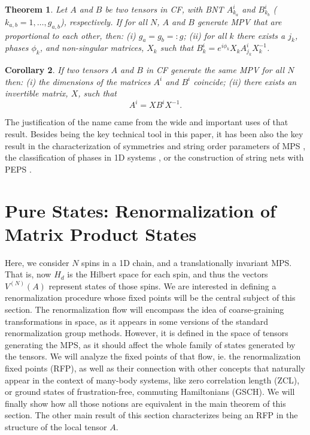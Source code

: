 \documentclass{elsarticle}
\newcommand{\be}{\begin{equation}}
\newcommand{\ee}{\end{equation}}
\newtheorem{thm}{Theorem}[section]
\newtheorem{cor}[thm]{Corollary}
\begin{document}
\begin{thm}
\label{thm1}
Let $A$ and $B$ be two tensors in CF, with BNT $A^i_{k_a}$ and $B^i_{k_b}$ ($k_{a,b}=1,\dots,g_{a,b}$), respectively. If for all $N$, $A$ and $B$ generate MPV that are proportional to each other, then: (i) $g_a=g_b=:g$; (ii) for all $k$ there exists a $j_k$, phases $\phi_{k}$, and non-singular matrices, $X_{k}$ such that $B^i_{k}=e^{i\phi_{k}}X_{k}A^i_{j_k}X_{k}^{-1}$.
\end{thm}

\begin{cor}
\label{II_cor2}
If two tensors $A$ and $B$ in CF generate the same MPV for all $N$ then: (i) the dimensions of the matrices $A^i$ and $B^i$ coincide; (ii) there exists an invertible matrix, $X$, such that
 \be
 \label{eq:II_auxcor}
 A^i = X B^i X^{-1}.
 \ee
\end{cor}

The justification of the name came from the wide and important uses of that result. Besides being the key technical tool in this paper, it has been also the key result in the characterization of symmetries and string order parameters of MPS \cite{Sanz}, the classification of phases in 1D systems \cite{Wen,Norbertphases}, or the construction of string nets with PEPS \cite{FrankStrings}.



\section{Pure States: Renormalization of Matrix Product States}\label{Sec:MPS}

Here, we consider $N$ spins in a 1D chain, and a translationally invariant MPS. That is, now $H_d$ is the Hilbert space for each spin, and thus the vectors $V^{(N)}(A)$ represent states of those spins.
We are interested in defining a renormalization procedure whose fixed points will be the central subject of this section. The renormalization flow will encompass the idea of coarse-graining transformations in space, as it appears in some versions of the standard renormalization group methods. However, it is defined in the space of tensors generating the MPS, as it should affect the whole family of states generated by the tensors. We will analyze the fixed points of that flow, ie. the renormalization fixed points (RFP), as well as their connection with other concepts that naturally appear in the context of many-body systems, like zero correlation length (ZCL), or ground states of frustration-free, commuting Hamiltonians (GSCH). We will finally show how all those notions are equivalent in the main theorem of this section. The other main result of this section characterizes being an RFP in the structure of the local tensor $A$.
\end{document}
